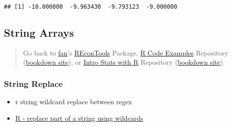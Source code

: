 \documentclass[
]{book}
\newenvironment{Shaded}{\begin{snugshade}}{\end{snugshade}}
\newcommand{\AttributeTok}[1]{\textcolor[rgb]{0.77,0.63,0.00}{#1}}
\newcommand{\CommentTok}[1]{\textcolor[rgb]{0.56,0.35,0.01}{\textit{#1}}}
\newcommand{\FunctionTok}[1]{\textcolor[rgb]{0.00,0.00,0.00}{#1}}
\newcommand{\NormalTok}[1]{#1}
\newcommand{\SpecialCharTok}[1]{\textcolor[rgb]{0.00,0.00,0.00}{#1}}
\newcommand{\StringTok}[1]{\textcolor[rgb]{0.31,0.60,0.02}{#1}}
\providecommand{\tightlist}{%
  \setlength{\itemsep}{0pt}\setlength{\parskip}{0pt}}
\begin{document}
\begin{verbatim}
## [1] -10.000000  -9.963430  -9.793123  -9.000000
\end{verbatim}

\hypertarget{string-arrays}{%
\subsection{String Arrays}\label{string-arrays}}

\begin{quote}
Go back to \href{http://fanwangecon.github.io/}{fan}'s \href{https://fanwangecon.github.io/REconTools/}{REconTools} Package, \href{https://fanwangecon.github.io/R4Econ/}{R Code Examples} Repository (\href{https://fanwangecon.github.io/R4Econ/bookdown}{bookdown site}), or \href{https://fanwangecon.github.io/Stat4Econ/}{Intro Stats with R} Repository (\href{https://fanwangecon.github.io/Stat4Econ/bookdown}{bookdown site}).
\end{quote}

\hypertarget{string-replace}{%
\subsubsection{String Replace}\label{string-replace}}

\begin{itemize}
\tightlist
\item
  r string wildcard replace between regex
\item
  \href{https://stackoverflow.com/a/27246520/8280804}{R - replace part of a string using wildcards}
\end{itemize}

\begin{Shaded}
\end{Shaded}
\end{document}
